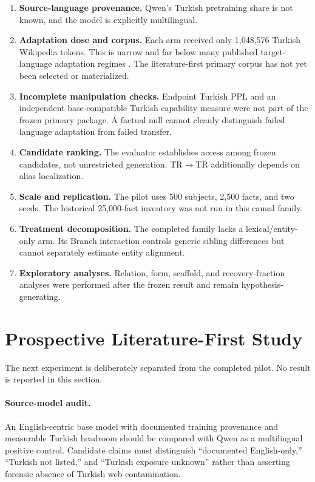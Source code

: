 \documentclass[10pt,a4paper,twocolumn]{article}
\newcommand{\trtotr}{TR$\rightarrow$TR}
\begin{document}
\begin{enumerate}
  \item \textbf{Source-language provenance.} Qwen's Turkish pretraining share is not known, and the model is explicitly multilingual.
  \item \textbf{Adaptation dose and corpus.} Each arm received only 1,048,576 Turkish Wikipedia tokens. This is narrow and far below many published target-language adaptation regimes \citep{acikgoz2024bosphorus}. The literature-first primary corpus has not yet been selected or materialized.
  \item \textbf{Incomplete manipulation checks.} Endpoint Turkish PPL and an independent base-compatible Turkish capability measure were not part of the frozen primary package. A factual null cannot cleanly distinguish failed language adaptation from failed transfer.
  \item \textbf{Candidate ranking.} The evaluator establishes access among frozen candidates, not unrestricted generation. \trtotr{} additionally depends on alias localization.
  \item \textbf{Scale and replication.} The pilot uses 500 subjects, 2,500 facts, and two seeds. The historical 25,000-fact inventory was not run in this causal family.
  \item \textbf{Treatment decomposition.} The completed family lacks a lexical/entity-only arm. Its Branch interaction controls generic sibling differences but cannot separately estimate entity alignment.
  \item \textbf{Exploratory analyses.} Relation, form, scaffold, and recovery-fraction analyses were performed after the frozen result and remain hypothesis-generating.
\end{enumerate}

\section{Prospective Literature-First Study}

The next experiment is deliberately separated from the completed pilot. No result is reported in this section.

\paragraph{Source-model audit.}
An English-centric base model with documented training provenance and measurable Turkish headroom should be compared with Qwen as a multilingual positive control. Candidate claims must distinguish ``documented English-only,'' ``Turkish not listed,'' and ``Turkish exposure unknown'' rather than asserting forensic absence of Turkish web contamination.
\end{document}
